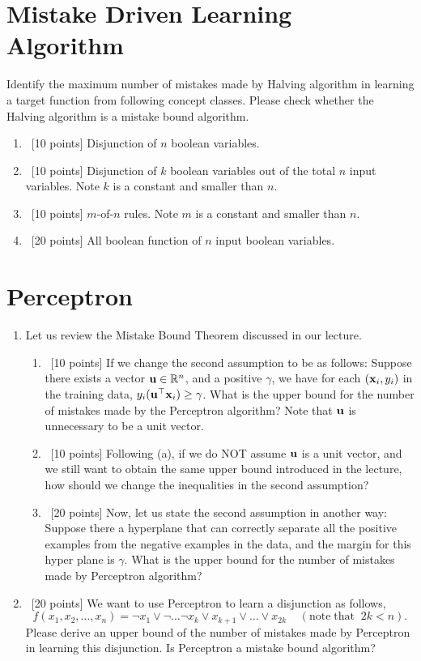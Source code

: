 \documentclass[12pt, fullpage,letterpaper]{article}
\begin{document}
\section{Mistake Driven Learning Algorithm}
Identify the maximum number of mistakes made by Halving algorithm in learning a target function from following concept classes. Please check whether the Halving algorithm is a mistake bound algorithm.
\begin{enumerate}
\item~[10 points] Disjunction of $n$ boolean variables.
\item~[10 points] Disjunction of $k$ boolean variables out of the total $n$ input variables. Note $k$ is a constant and smaller than $n$.
\item~[10 points] $m$-of-$n$ rules. Note $m$ is a constant and smaller than $n$.
\item~[20 points] All boolean function of $n$ input boolean variables.
\end{enumerate}

\section{Perceptron}
\begin{enumerate}
\item  Let us review the Mistake Bound Theorem discussed in our lecture.
\begin{enumerate}
	\item~[10 points] If we change the second assumption to be as follows: Suppose there exists a vector ${\bf u}\in \mathbb{R}^n$, and a positive $\gamma$, we have for each $({\bf x}_i, y_i)$ in the training data, $y_i({\bf u}^\top {\bf x}_i) \ge \gamma$. What is the upper bound for the number of mistakes made by the Perceptron algorithm?   Note that ${\bf u}$ is unnecessary to be a unit vector.
	\item~[10 points] Following (a), if we do NOT assume ${\bf u}$ is a unit vector, and we still want to obtain the same upper bound introduced in the lecture, how should we change the inequalities in the second assumption?
	\item~[20 points]  Now, let us state the second assumption in another way: Suppose there a hyperplane that can correctly separate all the positive examples from the negative examples in the data, and the margin for this hyper plane is $\gamma$. What is the upper bound for the number of mistakes made by Perceptron algorithm?
\end{enumerate}

\item~[20 points] We want to use Perceptron to learn a disjunction as follows,
\[
f(x_1, x_2, \ldots, x_n) = \neg x_1 \lor \neg \ldots \neg x_k \lor x_{k+1} \lor \ldots \lor x_{2k} \;\;\;\;(\mathrm{note\; that}\;\; 2k < n).
\]
Please derive an upper bound of the number of mistakes made by Perceptron in learning this disjunction. Is Perceptron a mistake bound algorithm?
\end{enumerate}
\end{document}
